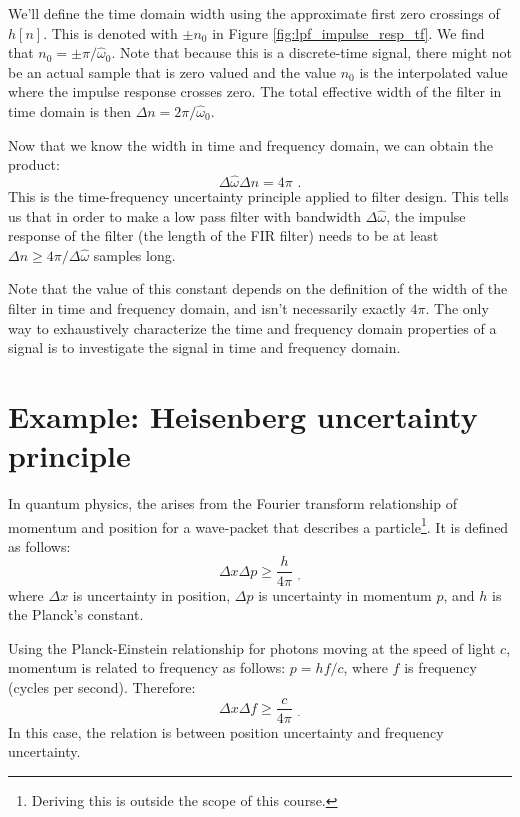 We'll define the time domain width using the approximate first zero
crossings of $h[n]$. This is denoted with $\pm n_0$ in
Figure \ref{fig:lpf_impulse_resp_tf}. We find that $n_0
= \pm \pi/\hat{\omega}_0$. Note that because this is a discrete-time
signal, there might not be an actual sample that is zero valued and
the value $n_0$ is the interpolated value where the impulse
response crosses zero. The total effective width of the filter in time
domain is then $\Delta n = 2\pi/\hat{\omega}_0$.

Now that we know the width in time and frequency domain, we can obtain
the product:
\begin{equation}
\Delta\hat{\omega}\Delta n = 4\pi \,\,.
\end{equation}
This is the time-frequency uncertainty principle applied to filter
design. This tells us that in order to make a low pass filter with
bandwidth $\Delta \hat{\omega}$, the impulse response of the filter
(the length of the FIR filter) needs to be at least $\Delta n \ge
4\pi/\Delta \hat{\omega}$ samples long.

Note that the value of this constant depends on the definition of the
width of the filter in time and frequency domain, and isn't
necessarily exactly $4\pi$. The only way to exhaustively characterize
the time and frequency domain properties of a signal is to investigate
the signal in time and frequency domain.




\section{Example: Heisenberg uncertainty principle}

In quantum physics, the \emph{} arises from the Fourier
transform relationship of momentum and position for a wave-packet that
describes a particle\footnote{Deriving this is outside the scope of
this course.}. It is defined as follows:
\begin{equation}
  \Delta x \Delta p \ge \frac{h}{4\pi} \,\, _,
  \label{eq:pos_mom}
\end{equation}
where $\Delta x$ is uncertainty in position, $\Delta p$ is uncertainty
in momentum $p$, and $h$ is the Planck's constant.

Using the Planck-Einstein relationship for photons moving at the speed
of light $c$, momentum is related to frequency as follows: $p=hf/c$,
where $f$ is frequency (cycles per second). Therefore:
\begin{equation}
  \Delta x \Delta f \ge \frac{c}{4\pi} \,\, _.
\end{equation}
In this case, the relation is between position uncertainty and
frequency uncertainty. 

\fi
